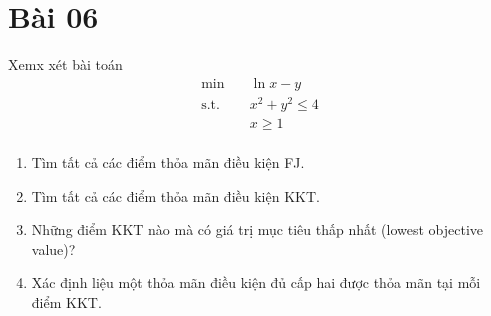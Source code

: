 \section{Bài 06}

Xemx xét bài toán 
\begin{equation}
    \begin{aligned}
        \min \quad & \ln x - y\\
        \textrm{s.t.} \quad & x^2 + y^2 \leq 4\\
          & x \geq 1\\
    \end{aligned}
\end{equation}

\begin{enumerate}[label=(\alph*)]
    \item Tìm tất cả các điểm thỏa mãn điều kiện FJ.
    \item Tìm tất cả các điểm thỏa mãn điều kiện KKT.
    \item Những điểm KKT nào mà có giá trị mục tiêu thấp nhất (lowest objective value)?
    \item Xác định liệu một thỏa mãn điều kiện đủ cấp hai được thỏa mãn tại mỗi điểm KKT.
\end{enumerate}

